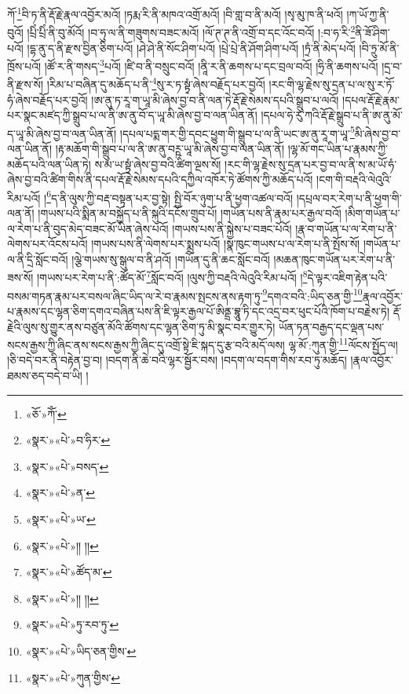 ཀོ་\footnote{«ཅོ་»ཀོཾ་}བི་ཏ་ནི་རྡོ་རྗེ་རྣལ་འབྱོར་མའོ། །ཏརྨ་རི་ནི་མཁའ་འགྲོ་མའོ། །བི་གླ་བ་ནི་མའོ། །སྭ་མུ་ཁ་ནི་ཕའོ། །ཀ་ཡོ་ཀྱ་ནི་བུའོ། །པྲིཾ་པྲིཾ་ནི་བུ་མོའོ། །བ་ཧུ་ལ་ནི་གཟུགས་བཟང་མའོ། །ལོ་ཊ་ཊ་ནི་འགྲོ་བ་དང་འོང་བའོ། །:བ་ཧ་རི་\footnote{«སྣར་»«པེ་»བ་ཧིར་}ནི་ཟོ་ཤིག་པའོ། །དྷ་ནུ་ད་ནི་རྫས་བྱིན་ཅིག་པའོ། །ཤེ་ཤེ་ནི་སོང་ཤིག་པའོ། །པྲེ་པྲེ་ནི་ཤོག་ཤིག་པའོ། །ཏྲཾ་ནི་མེད་པའོ། །བི་ཏྲུ་མོ་ནི་ཁྲོས་པའོ། །ཚོ་ར་ནི་གསད་\footnote{«སྣར་»«པེ་»བསད་}པའོ། །ཛི་བ་ནི་བསྲུང་བའོ། །ནཱི་ར་ནི་ཆགས་པ་དང་བྲལ་བའོ། །ཧྲི་ནི་ཆགས་པའོ། །དྲ་བ་ནི་རྫས་སོ། །རིམ་པ་བཞིན་དུ་མཆོད་པ་ནི་\footnote{«སྣར་»«པེ་»ན་}སུ་ར་ཏ་སྟྭཾ་ཞེས་བརྗོད་པར་བྱའོ། །རང་གི་ལྷ་རྗེས་སུ་དྲན་པ་ལ་སུ་ར་ཏོ་ཧཾ་ཞེས་བརྗོད་པར་བྱའོ། །ཨ་ནུ་ཏ་རཱ་ག་ཡཱ་མི་ཞེས་བྱ་བ་ནི་ལན་ཏེ་རྡོ་རྗེ་སེམས་དཔའི་སྒྲུབ་པ་ལའོ། །དཔལ་རྡོ་རྗེ་རྣམ་པར་སྣང་མཛད་ཀྱི་སྒྲུབ་པ་ལ་ནི་ཨ་ནུ་བོ་ད་ཡཱ་མི་ཞེས་བྱ་བ་ལན་ཡིན་ནོ། །དཔལ་ཧེ་རུ་ཀའི་རྡོ་རྗེ་སྒྲུབ་པ་ནི་ཨ་ནུ་མོ་ད་ཡཱ་མི་ཞེས་བྱ་བ་ལན་ཡིན་ནོ། །དཔལ་པདྨ་གར་གྱི་དབང་ཕྱུག་གི་སྒྲུབ་པ་ལ་ནི་ཡང་ཨ་ནུ་རཱ་ག་ཡཱ་\footnote{«སྣར་»«པེ་»ཡ་}མི་ཞེས་བྱ་བ་ལན་ཡིན་ནོ། །རྟ་མཆོག་གི་སྒྲུབ་པ་ལ་ནི་ཨ་ནུ་བཪྵ་ཡཱ་མི་ཞེས་བྱ་བ་ལན་ཡིན་ནོ། །ལྷ་མོ་གང་ཡིན་པ་རྣམས་ཀྱི་མཆོད་པའི་ལན་ཡིན་ཏེ། ས་མ་ཡ་སྟྭཾ་ཞེས་བྱ་བའི་ཚིག་ལྔས་སོ། །རང་གི་ལྷ་རྗེས་སུ་དྲན་པར་བྱ་བ་ལ་ནི་ས་མ་ཡོ་ཧཾ་ཞེས་བྱ་བའི་ཚིག་གིས་ནི་དཔལ་རྡོ་རྗེ་སེམས་དཔའི་དཀྱིལ་འཁོར་ཏེ་ཚོགས་ཀྱི་མཆོད་པའོ། །ངག་གི་བརྡའི་ལེའུའི་རིམ་པའོ། །\footnote{«སྣར་»«པེ་»།། །།}ད་ནི་ལུས་ཀྱི་བརྡ་བསྟན་པར་བྱ་སྟེ། སྤྱི་བོར་ཉུག་པ་ནི་ཕྱག་འཚལ་བའོ། །དཔྲལ་བར་རེག་པ་ནི་ཕྱག་གི་ལན་ནོ། །གཡས་པའི་སྨིན་མ་བསྐྱོད་པ་ནི་སྐུའི་དངོས་གྲུབ་པོ། །གཡོན་པས་ནི་རྣམ་པར་རྒྱལ་བའོ། །མིག་གཡོན་པ་ལ་རེག་པ་ནི་བུད་མེད་བཟང་མོ་ཡིན་ཞེས་པའོ། །གཡས་པས་ནི་སྐྱེས་པ་བཟང་པོའོ། །རྣ་བ་གཡོན་པ་ལ་རེག་པ་ནི་ལེགས་པར་འོངས་པའོ། །གཡས་པས་ནི་ལེགས་པར་སྨྲས་པའོ། །སྣ་ཁུང་གཡས་པ་ལ་རེག་པ་ནི་སྤོས་སོ། །གཡོན་པ་ལ་ནི་དྲི་སློང་བའོ། །ལྕེ་གཡས་སུ་སྒུལ་བ་ནི་ཤའོ། །གཡོན་དུ་ནི་ཆང་སློང་བའོ། །མཆན་ཁུང་གཡོན་པར་རེག་པ་ནི་ཟས་སོ། །གཡས་པར་རེག་པ་ནི་:ཚོད་མོ་\footnote{«སྣར་»«པེ་»ཚོད་མ་}སློང་བའོ། །ལུས་ཀྱི་བརྡའི་ལེའུའི་རིམ་པའོ། །\footnote{«སྣར་»«པེ་»།། །།}དེ་ལྟར་འཇིག་རྟེན་པའི་བསམ་གཏན་རྣམ་པར་བསལ་ཞིང་ཡིད་ལ་རེ་བ་རྣམས་སྤངས་ནས་རྟག་ཏུ་\footnote{«སྣར་»«པེ་»ཏུ་རབ་ཏུ་}དགའ་བའི་:ཡིད་ཅན་གྱི་\footnote{«སྣར་»«པེ་»ཡིད་ཅན་གྱིས་}རྣལ་འབྱོར་པ་རྣམས་དང་ལྷན་ཅིག་དགའ་བཞིན་པས་ནི་ཇི་ལྟར་རྒྱལ་པོ་ཨིནྡྲ་བྷཱུ་ཏི་དང་འདྲ་བར་ཕུང་པོའི་ཁོག་པ་བརྗེས་ཏེ། རྡོ་རྗེའི་ལུས་སུ་གྱུར་ནས་བཙུན་མོའི་ཚོགས་དང་ལྷན་ཅིག་ཏུ་མི་སྣང་བར་གྱུར་ཏེ། ཡོན་ཏན་བརྒྱད་དང་ལྡན་པས་སངས་རྒྱས་ཀྱི་ཞིང་ནས་སངས་རྒྱས་ཀྱི་ཞིང་དུ་འགྲོ་སྟེ་ཇི་སྐད་དུ་རྩ་བའི་མདོ་ལས། ལྷ་མོ་:ཀུན་གྱི་\footnote{«སྣར་»«པེ་»ཀུན་གྱིས་}ལོངས་སྤྱོད་ལ། །ཅི་བདེ་བར་ནི་བརྟེན་བྱ་བ། །བདག་ནི་ཆེ་བའི་ལྷར་སྦྱོར་བས། །བདག་ལ་བདག་གིས་རབ་ཏུ་མཆོད། །རྣལ་འབྱོར་ཐམས་ཅད་བདེ་བ་ཡི། །
